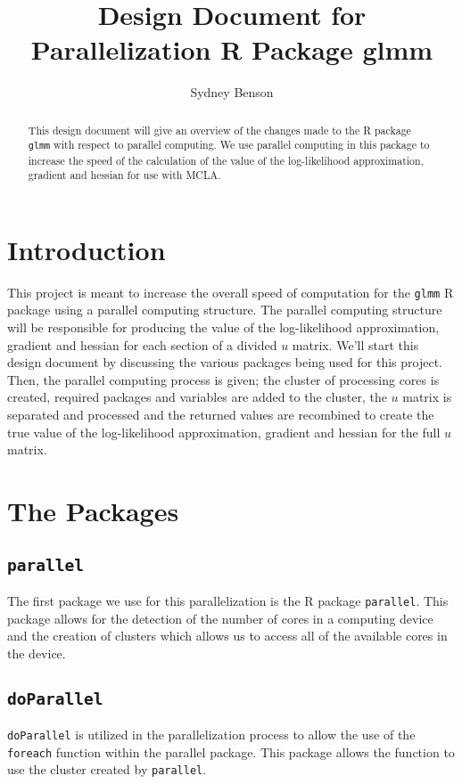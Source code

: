 \documentclass{article}
\title{Design Document for Parallelization R Package glmm}
\author{Sydney Benson}
\begin{document}
\maketitle{}

\begin{abstract}
This design document will give an overview of the changes made to the R package \texttt{glmm} with respect to parallel computing. We use parallel computing in this package to increase the speed of the calculation of the value of the log-likelihood approximation, gradient and hessian for use with MCLA. 
\end{abstract}

\section{Introduction}
This project is meant to increase the overall speed of computation for the \texttt{glmm} R package using a parallel computing structure. The parallel computing structure will be responsible for producing the value of the log-likelihood approximation, gradient and hessian for each section of a divided $u$ matrix. We'll start this design document by discussing the various packages being used for this project. Then, the parallel computing process is given; the cluster of processing cores is created, required packages and variables are added to the cluster, the $u$ matrix is separated and processed and the returned values are recombined to create the true value of the log-likelihood approximation, gradient and hessian for the full $u$ matrix.

\section{The Packages}
\subsection{\texttt{parallel}}
The first package we use for this parallelization is the R package \texttt{parallel}. This package allows for the detection of the number of cores in a computing device and the creation of clusters which allows us to access all of the available cores in the device.

\subsection{\texttt{doParallel}}
\texttt{doParallel} is utilized in the parallelization process to allow the use of the \texttt{foreach} function within the parallel package. This package allows the function to use the cluster created by \texttt{parallel}. 
\end{document}
